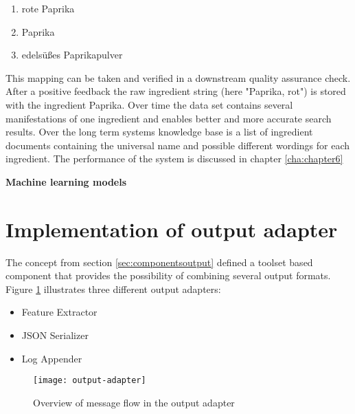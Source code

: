 \begin{enumerate}
\item rote Paprika
\item Paprika
\item edelsüßes Paprikapulver
\end{enumerate}
This mapping can be taken and verified in a downstream quality assurance check. After a positive feedback the raw ingredient string (here "Paprika, rot") is stored with the ingredient Paprika. Over time the data set contains several manifestations of one ingredient and enables better and more accurate search results. Over the long term systems knowledge base is a list of ingredient documents containing the universal name and possible different wordings for each ingredient. The performance of the system is discussed in chapter \ref{cha:chapter6}

\textbf{Machine learning models}


\section{Implementation of output adapter}

The concept from section \ref{sec:componentsoutput} defined a toolset based component that provides the possibility of combining several output formats. Figure \ref{fig:output-adapter} illustrates three different output adapters:
\begin{itemize}
\item Feature Extractor
\item JSON Serializer
\item Log Appender
\end{itemize}

\begin{figure}[htb]
  \centering
  \texttt{[image: output-adapter]}\\
  \caption{Overview of message flow in the output adapter}
  \label{fig:output-adapter}
\end{figure}

